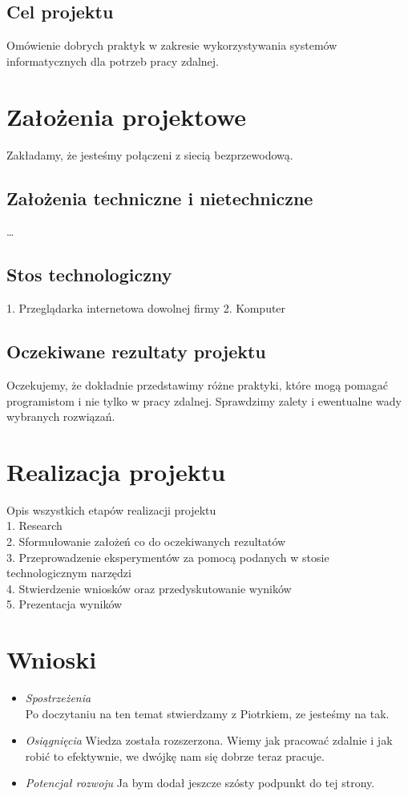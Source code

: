\documentclass[12pt,a4paper]{article}
\begin{document}
\subsection{Cel projektu}
Omówienie dobrych praktyk w zakresie wykorzystywania systemów informatycznych dla potrzeb pracy zdalnej.

\newpage

\section{Założenia projektowe}
Zakładamy, że jesteśmy połączeni z siecią bezprzewodową. \\
\subsection{Założenia techniczne i nietechniczne}
\ldots 

\subsection{Stos technologiczny}
1. Przeglądarka internetowa dowolnej firmy
2. Komputer

\subsection{Oczekiwane rezultaty projektu}
Oczekujemy, że dokładnie przedstawimy różne praktyki, które mogą pomagać programistom i nie tylko w pracy zdalnej. Sprawdzimy zalety i ewentualne wady wybranych rozwiązań.


\newpage
\section{Realizacja projektu}
Opis wszystkich etapów realizacji projektu \\
1. Research \\
2. Sformułowanie założeń co do oczekiwanych rezultatów \\
3. Przeprowadzenie eksperymentów za pomocą podanych w stosie technologicznym narzędzi \\
4. Stwierdzenie wniosków oraz przedyskutowanie wyników \\
5. Prezentacja wyników \\

\newpage
\section{Wnioski}

\begin{itemize}
\item \textit{Spostrzeżenia} \\
Po doczytaniu na ten temat stwierdzamy z Piotrkiem, ze jesteśmy na tak.
\item \textit{Osiągnięcia}
Wiedza została rozszerzona. Wiemy jak pracować zdalnie i jak robić to efektywnie, we dwójkę nam się dobrze teraz pracuje.
\item \textit{Potencjał rozwoju}
Ja bym dodał jeszcze szósty podpunkt do tej strony.
\end{itemize}
\end{document}
